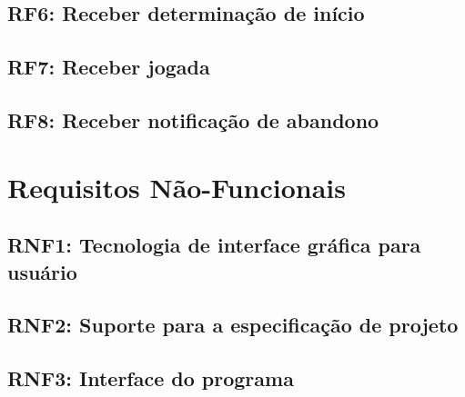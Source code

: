   \subsection{RF6: Receber determinação de início} \lipsum[1] %
  \subsection{RF7: Receber jogada} \lipsum[1] %
  \subsection{RF8: Receber notificação de abandono} \lipsum[1] %

\section{Requisitos Não-Funcionais}

  \subsection{RNF1: Tecnologia de interface gráfica para usuário} \lipsum[1] %
  \subsection{RNF2: Suporte para a especificação de projeto} \lipsum[1] %
  \subsection{RNF3: Interface do programa} \lipsum[1] %

